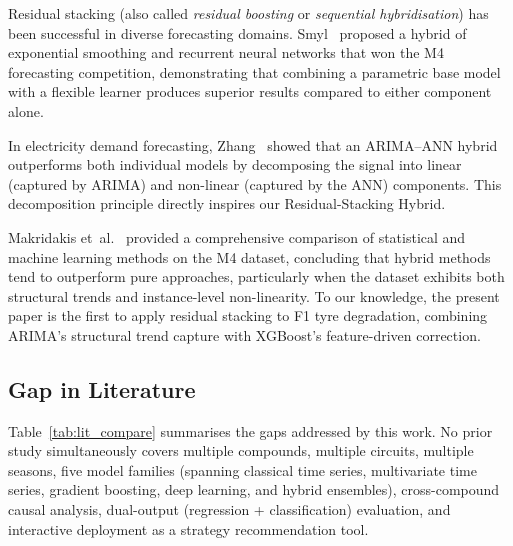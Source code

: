 \documentclass[journal,twoside]{IEEEtran}
\begin{document}
Residual stacking (also called \emph{residual boosting} or
\emph{sequential hybridisation}) has been successful in diverse
forecasting domains.  Smyl~\cite{residual_boost2021} proposed a hybrid
of exponential smoothing and recurrent neural networks that won the M4
forecasting competition, demonstrating that combining a parametric base
model with a flexible learner produces superior results compared to
either component alone.

In electricity demand forecasting, Zhang~\cite{zhang2003time} showed
that an ARIMA--ANN hybrid outperforms both individual models by
decomposing the signal into linear (captured by ARIMA) and non-linear
(captured by the ANN) components.  This decomposition principle directly
inspires our Residual-Stacking Hybrid.

Makridakis et~al.~\cite{makridakis2018statistical} provided a
comprehensive comparison of statistical and machine learning methods on
the M4 dataset, concluding that hybrid methods tend to outperform
pure approaches, particularly when the dataset exhibits both
structural trends and instance-level non-linearity.  To our knowledge,
the present paper is the first to apply residual stacking to F1 tyre
degradation, combining ARIMA's structural trend capture with
XGBoost's feature-driven correction.

\subsection{Gap in Literature}

Table~\ref{tab:lit_compare} summarises the gaps addressed by this work.
No prior study simultaneously covers multiple compounds, multiple
circuits, multiple seasons, five model families (spanning classical
time series, multivariate time series, gradient boosting, deep learning,
and hybrid ensembles), cross-compound causal analysis, dual-output
(regression + classification) evaluation, and interactive deployment
as a strategy recommendation tool.
\end{document}
